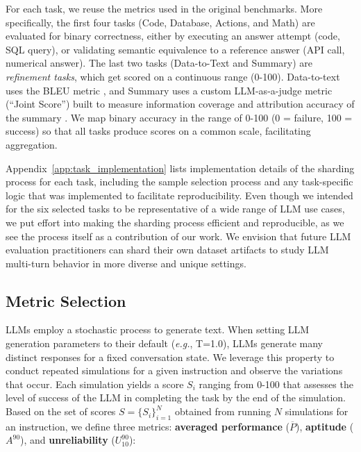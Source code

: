 \documentclass{article}
\begin{document}
For each task, we reuse the metrics used in the original benchmarks. More specifically, the first four tasks (Code, Database, Actions, and Math) are evaluated for binary correctness, either by executing an answer attempt (code, SQL query), or validating semantic equivalence to a reference answer (API call, numerical answer). The last two tasks (Data-to-Text and Summary) are \textit{refinement tasks}, which get scored on a continuous range (0-100). Data-to-text uses the BLEU metric \cite{papineni2002bleu}, and Summary uses a custom LLM-as-a-judge metric (``Joint Score'') built to measure information coverage and attribution accuracy of the summary \cite{laban2024summary}. We map binary accuracy in the range of 0-100 (0 = failure, 100 = success) so that all tasks produce scores on a common scale, facilitating aggregation.

Appendix~\ref{app:task_implementation} lists implementation details of the sharding process for each task, including the sample selection process and any task-specific logic that was implemented to facilitate reproducibility. Even though we intended for the six selected tasks to be representative of a wide range of LLM use cases, we put effort into making the sharding process efficient and reproducible, as we see the process itself as a contribution of our work. We envision that future LLM evaluation practitioners can shard their own dataset artifacts to study LLM multi-turn behavior in more diverse and unique settings.

\subsection{Metric Selection} \label{sec:metrics}

LLMs employ a stochastic process to generate text. When setting LLM generation parameters to their default (\textit{e.g.}, T=1.0), LLMs generate many distinct responses for a fixed conversation state. We leverage this property to conduct repeated simulations for a given instruction and observe the variations that occur.
Each simulation yields a score $S_{i}$ ranging from 0-100 that assesses the level of success of the LLM in completing the task by the end of the simulation. Based on the set of scores $S = \{S_i\}_{i=1}^N$ obtained from running $N$ simulations for an instruction, we define three metrics: \textbf{averaged performance} ($\overline{P}$), \textbf{aptitude} ($A^{90}$), and \textbf{unreliability} ($U_{10}^{90}$):
\end{document}
